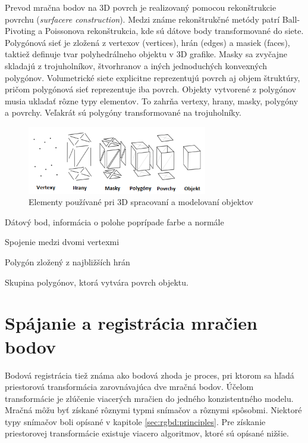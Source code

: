 Prevod mračna bodov na 3D povrch je realizovaný pomocou rekonštrukcie povrchu (\textit{surfacere construction}). Medzi známe rekonštrukčné metódy patrí Ball-Pivoting a  Poissonova rekonštrukcia, kde sú dátove body transformované do siete. Polygónová sieť je zložená z vertexov (vertices), hrán (edges) a masiek (faces), taktiež definuje tvar polyhedrálneho objektu v 3D grafike. Masky sa zvyčajne skladajú z trojuholníkov, štvorhranov a iných jednoduchých konvexných polygónov. Volumetrické siete explicitne reprezentujú povrch aj objem štruktúry, pričom polygónová sieť reprezentuje iba povrch. Objekty vytvorené z polygónov musia ukladať rôzne typy elementov. To zahrňa vertexy, hrany, masky, polygóny a povrchy. Veľakrát sú polygóny transformované na trojuholníky.

\begin{figure}[h]

	\centering
	\includegraphics[width=0.7\textwidth]{figures/vertex_edge_polygon.png} 
	\caption{Elementy používané pri 3D spracovaní a modelovaní objektov }
	\label{fig:vertex_edge_polygon}

\end{figure}

\begin{description}[leftmargin=*,labelsep=5.8mm, font=$\bullet$~\normalfont\scshape\color{black!20!black}]
	\item[Vertex] Dátový bod, informácia o polohe poprípade farbe a normále 
	\item[Hrana] Spojenie medzi dvomi vertexmi 
	\item[Maska] Polygón zložený z najbližších hrán
	\item[Povrch] Skupina polygónov, ktorá vytvára povrch objektu.
\end{description}

\newpage
\section{Spájanie a registrácia mračien bodov}

Bodová registrácia tiež známa ako bodová zhoda je proces, pri ktorom sa hľadá priestorová transformácia zarovnávajúca dve mračná bodov. Účelom transformácie je zlúčenie viacerých mračien do jedného konzistentného modelu. Mračná môžu byť získané rôznymi typmi snímačov a rôznymi spôsobmi. Niektoré typy snímačov boli opísané v kapitole \ref{sec:rgbd:principles}. Pre získanie priestorovej transformácie existuje viacero algoritmov, ktoré sú opísané nižšie.


